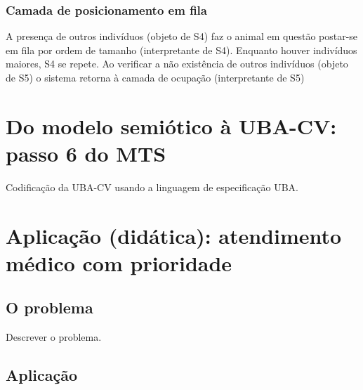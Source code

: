 \subsubsection*{Camada de posicionamento em fila}

A presença de outros indivíduos (objeto de S4) faz o animal em questão postar-se em fila por ordem de tamanho (interpretante de S4). Enquanto houver indivíduos maiores, S4 se repete. Ao verificar a não existência de outros indivíduos (objeto de S5) o sistema retorna à camada de ocupação (interpretante de S5)


\section{Do modelo semiótico à UBA-CV: passo 6 do MTS}

Codificação da UBA-CV usando a linguagem de especificação UBA.

\section{Aplicação (didática): atendimento médico com prioridade }

\subsection{O problema}

Descrever o problema.

\subsection{Aplicação}
